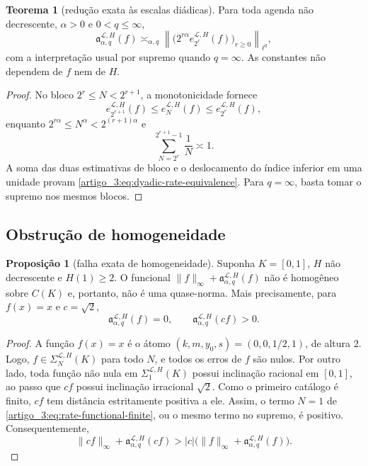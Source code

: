 \documentclass[12pt,a4paper]{article}
\theoremstyle{preciso}
\theoremstyle{definition}
\newcommand{\Library}{\mathcal{L}}
\theoremstyle{preciso}
\newtheorem{theorem}[teorema]{Teorema}
\theoremstyle{preciso}
\theoremstyle{preciso}
\newtheorem{proposition}[teorema]{Proposição}
\theoremstyle{preciso}
\theoremstyle{definition}
\theoremstyle{preciso}
\theoremstyle{definition}
\theoremstyle{preciso}
\theoremstyle{preciso}
\theoremstyle{definition}
\begin{document}
\begin{theorem}[redução exata às escalas diádicas]\label{map:artigo_3:3.2}
\label{artigo_3:thm:dyadic-rate-equivalence}
Para toda agenda não decrescente, $\alpha>0$ e $0<q\le\infty$,
\begin{equation}
 \mathfrak a_{\alpha,q}^{\Library,H}(f)
 \asymp_{\alpha,q}
 \left\|\bigl(2^{r\alpha}
 e_{2^r}^{\Library,H}(f)\bigr)_{r\ge0}\right\|_{\ell^q},
 \label{artigo_3:eq:dyadic-rate-equivalence}
\end{equation}
com a interpretação usual por supremo quando $q=\infty$. As constantes não
dependem de $f$ nem de $H$.
\end{theorem}

\begin{proof}
No bloco $2^r\le N<2^{r+1}$, a monotonicidade fornece
\[
 e_{2^{r+1}}^{\Library,H}(f)
 \le e_N^{\Library,H}(f)
 \le e_{2^r}^{\Library,H}(f),
\]
enquanto $2^{r\alpha}\le N^\alpha<2^{(r+1)\alpha}$ e
\[
 \sum_{N=2^r}^{2^{r+1}-1}\frac1N\asymp1.
\]
A soma das duas estimativas de bloco e o deslocamento do índice inferior em uma
unidade provam \eqref{artigo_3:eq:dyadic-rate-equivalence}. Para $q=\infty$, basta
tomar o supremo nos mesmos blocos.
\end{proof}

\subsection{Obstrução de homogeneidade}

\begin{proposition}[falha exata de homogeneidade]\label{map:artigo_3:3.3}
\label{artigo_3:prop:nonhomogeneous-functional}
Suponha $K=[0,1]$, $H$ não decrescente e $H(1)\ge2$. O funcional
$\|f\|_\infty+\mathfrak a_{\alpha,q}^{\Library,H}(f)$ não é homogêneo sobre
$C(K)$ e, portanto, não é uma quase-norma. Mais precisamente, para
$f(x)=x$ e $c=\sqrt2$,
\begin{equation}
 \mathfrak a_{\alpha,q}^{\Library,H}(f)=0,
 \qquad
 \mathfrak a_{\alpha,q}^{\Library,H}(cf)>0.
 \label{artigo_3:eq:nonhomogeneous-certificate}
\end{equation}
\end{proposition}

\begin{proof}
A função $f(x)=x$ é o átomo $(k,m,y_0,s)=(0,0,1/2,1)$, de altura $2$.
Logo, $f\in\Sigma_N^{\Library,H}(K)$ para todo $N$, e todos os erros de
$f$ são nulos. Por outro lado, toda função não nula em
$\Sigma_1^{\Library,H}(K)$ possui inclinação racional em $[0,1]$, ao passo que
$cf$ possui inclinação irracional $\sqrt2$. Como o primeiro catálogo é
finito, $cf$ tem distância estritamente positiva a ele. Assim, o termo
$N=1$ de \eqref{artigo_3:eq:rate-functional-finite}, ou o mesmo termo no supremo,
é positivo. Consequentemente,
\[
 \|cf\|_\infty+\mathfrak a_{\alpha,q}^{\Library,H}(cf)
 >|c|\bigl(\|f\|_\infty+
 \mathfrak a_{\alpha,q}^{\Library,H}(f)\bigr).
\]
\end{proof}
\end{document}
